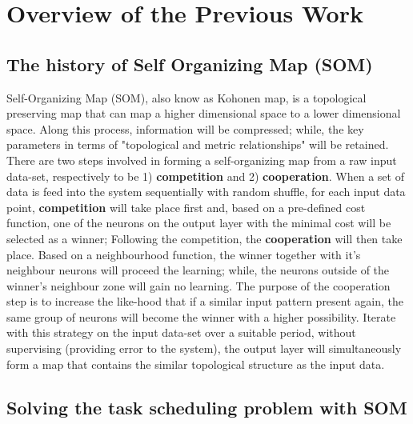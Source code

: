 \chapter{Overview of the Previous Work}

\section{The history of Self Organizing Map (SOM)}
Self-Organizing Map (SOM), also know as Kohonen map, is a topological preserving map that can map a higher dimensional space to a lower dimensional space. Along this process, information will be compressed; while, the key parameters in terms of "topological and metric relationships"\cite{Kohonen1998} will be retained. 
\\
There are two steps involved in forming a self-organizing map from a raw input data-set\cite{hebbian2007}, respectively to be 1) \textbf{competition} and 2) \textbf{cooperation}. When a set of data is feed into the system sequentially with random shuffle, for each input data point, \textbf{competition} will take place first and, based on a pre-defined cost function, one of the neurons on the output layer with the minimal cost will be selected as a winner; Following the competition, the  \textbf{cooperation} will then take place. Based on a neighbourhood function, the winner together with it's neighbour neurons will proceed the learning; while, the neurons outside of the winner's neighbour zone will gain no learning. The purpose of the cooperation step is to increase the like-hood that if a similar input pattern present again, the same group of neurons will become the winner with a higher possibility. Iterate with this strategy on the input data-set over a suitable period, without supervising (providing error to the system), the output layer will simultaneously form a map that contains the similar topological structure as the input data. 

\section{Solving the task scheduling problem with SOM }

